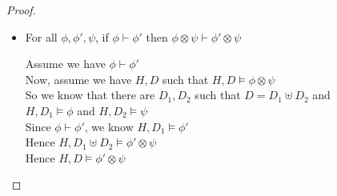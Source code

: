 \begin{proof}
\begin{itemize}
\item For all $\phi, \phi', \psi$, if $\phi \vdash \phi'$ then $\phi \otimes \psi \vdash \phi' \otimes \psi$  
\begin{tabbedproof}
\oo Assume we have $\phi \vdash \phi'$ \\
\oo Now, assume we have $H, D$ such that $H,D \models \phi \otimes \psi$ \\
\ooo So we know that there are $D_1, D_2$ such that $D = D_1 \uplus D_2$ and \\
\oox $H, D_1 \models \phi$ and $H, D_2 \models \psi$ \\
\ooo Since $\phi \vdash \phi'$, we know $H, D_1 \models \phi'$ \\
\ooo Hence $H, D_1 \uplus D_2 \models \phi' \otimes \psi$ \\
\ooo Hence $H, D \models \phi' \otimes \psi$ \\
\end{tabbedproof}



\end{itemize}
\end{proof}
